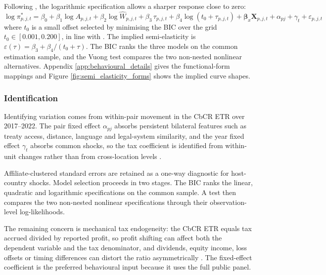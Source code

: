 \documentclass[11pt,a4paper]{article}
\begin{document}
Following \citet{garcia-bernardo2024}, the logarithmic specification allows a sharper response close to zero:
\begin{equation}\label{eq:panel_log}
\log \pi_{p,j,t}^{*} = \beta_0 + \beta_1 \log A_{p,j,t} + \beta_2 \log \hat{W}_{p,j,t} + \beta_3 \, \tau_{p,j,t} + \beta_4 \log(t_0 + \tau_{p,j,t}) + \mathbf{\beta}_x \mathbf{X}_{p,j,t} + \alpha_{pj} + \gamma_t + \varepsilon_{p,j,t}
\end{equation}
where $t_0$ is a small offset selected by minimising the BIC over the grid $t_0 \in [0.001, 0.200]$, in line with \citep{garcia-bernardo2024}. The implied semi-elasticity is $\varepsilon(\tau) = \beta_3 + \beta_4/(t_0+\tau)$. The BIC ranks the three models on the common estimation sample, and the Vuong test compares the two non-nested nonlinear alternatives. Appendix \ref{app:behavioural_details} gives the functional-form mappings and Figure \ref{fig:semi_elasticity_forms} shows the implied curve shapes.

\subsubsection{Identification}\label{sec:identification}

Identifying variation comes from within-pair movement in the CbCR ETR over 2017--2022. The pair fixed effect $\alpha_{pj}$ absorbs persistent bilateral features such as treaty access, distance, language and legal-system similarity, and the year fixed effect $\gamma_t$ absorbs common shocks, so the tax coefficient is identified from within-unit changes rather than from cross-location levels \citep{dharmapala2014,heckemeyer2017}. 

Affiliate-clustered standard errors are retained as a one-way diagnostic for host-country shocks. Model selection proceeds in two stages. The BIC ranks the linear, quadratic and logarithmic specifications on the common sample. A \citet{vuong1989} test then compares the two non-nested nonlinear specifications through their observation-level log-likelihoods.

The remaining concern is mechanical tax endogeneity: the CbCR ETR equals tax accrued divided by reported profit, so profit shifting can affect both the dependent variable and the tax denominator, and dividends, equity income, loss offsets or timing differences can distort the ratio asymmetrically \citep{bobeldijk2019,blouin2023}. The fixed-effect coefficient is the preferred behavioural input because it uses the full public panel. 
\end{document}
